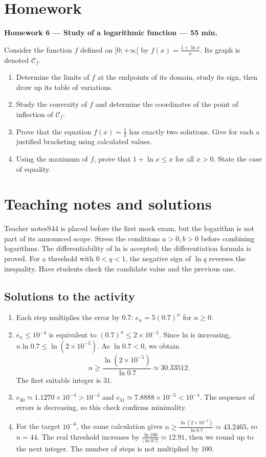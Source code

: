 \section{Homework}\textbf{Homework 6 --- Study of a logarithmic function --- 55 min.}\par Consider the function $f$ defined on $]0;+\infty[$ by $f(x)=\frac{1+\ln x}{x}$. Its graph is denoted $\mathcal C_f$.
\begin{enumerate}\item Determine the limits of $f$ at the endpoints of its domain, study its sign, then draw up its table of variations.
\item Study the convexity of $f$ and determine the coordinates of the point of inflection of $\mathcal C_f$.
\item Prove that the equation $f(x)=\frac12$ has exactly two solutions. Give for each a justified bracketing using calculated values.
\item Using the maximum of $f$, prove that $1+\ln x\le x$ for all $x>0$. State the case of equality.\end{enumerate}

\ifprof\clearpage\section{Teaching notes and solutions}\begin{profbox}{Teacher notes}S44 is placed before the first mock exam, but the logarithm is not part of its announced scope. Stress the conditions $a>0,b>0$ before combining logarithms. The differentiability of ln is accepted; the differentiation formula is proved. For a threshold with $0<q<1$, the negative sign of $\ln q$ reverses the inequality. Have students check the candidate value and the previous one.\end{profbox}

\subsection{Solutions to the activity}\begin{enumerate}
\item Each step multiplies the error by $0.7$: $e_n=5(0.7)^n$ for $n\ge0$.
\item $e_n\le10^{-4}$ is equivalent to $(0.7)^n\le2\times10^{-5}$. Since ln is increasing, $n\ln0.7\le\ln(2\times10^{-5})$. As $\ln0.7<0$, we obtain
\[n\ge\frac{\ln(2\times10^{-5})}{\ln0.7}\simeq30.33512.\]
The first suitable integer is $31$.
\item $e_{30}\simeq1.1270\times10^{-4}>10^{-4}$ and $e_{31}\simeq7.8888\times10^{-5}<10^{-4}$. The sequence of errors is decreasing, so this check confirms minimality.
\item For the target $10^{-6}$, the same calculation gives $n\ge\frac{\ln (2\times10^{-7})}{\ln 0.7}\simeq43.2465$, so $n=44$. The real threshold increases by $\frac{\ln 100}{|\ln0.7|}\simeq12.91$, then we round up to the next integer. The number of steps is not multiplied by $100$.
\end{enumerate}

